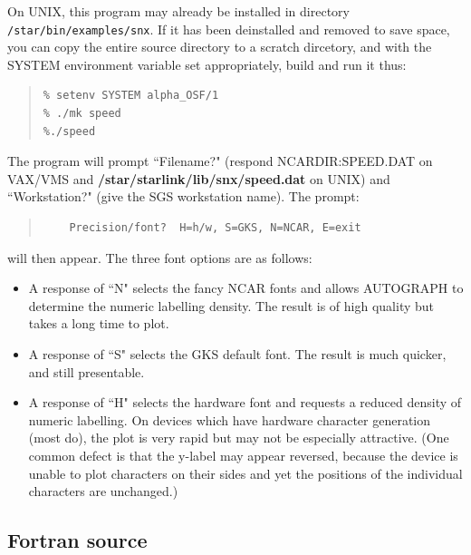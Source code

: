 \documentclass[twoside,11pt]{article}
\renewcommand{\_}{\texttt{\symbol{95}}}
\begin{document}
On UNIX, this program may already be installed in directory
{\tt /star/bin/examples/snx}.  If it has been deinstalled and removed to save
space, you can copy the entire source directory to a scratch dircetory, and
with the SYSTEM environment variable set appropriately, build and run it thus:

\begin {quote}
\begin{verbatim}
% setenv SYSTEM alpha_OSF/1
% ./mk speed
%./speed
\end{verbatim}
\end {quote}


The program will prompt ``Filename?" (respond NCAR\_DIR:SPEED.DAT on VAX/VMS
and {\bf /star/\-starlink/\-lib/\-snx/speed.dat} on UNIX) and ``Workstation?"
(give the SGS workstation name).
The prompt:

\begin {quote}
\begin{verbatim}
    Precision/font?  H=h/w, S=GKS, N=NCAR, E=exit
\end{verbatim}
\end {quote}

will then appear.
The three font options are as follows:

\begin{itemize}
\item A response of ``N" selects the fancy NCAR fonts and allows
AUTOGRAPH to determine the numeric labelling density.
The result is of high quality but takes a long time to plot.
\item A response of ``S" selects the GKS default font.
The result is much quicker, and still presentable.
\item A response of ``H" selects the hardware font and requests
a reduced density of numeric labelling.
On devices which have hardware character generation (most do),
the plot is very rapid but may not be especially attractive.
(One common defect is that the y-label may appear reversed, because the
device is unable to plot characters on their sides and yet the
positions of the individual characters are unchanged.)
\end{itemize}


\subsection {Fortran source}
\end{document}
